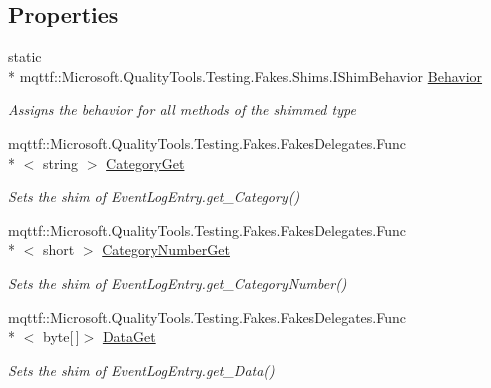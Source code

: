 \subsection*{Properties}
\begin{DoxyCompactItemize}
\item 
static \\*
mqttf\-::\-Microsoft.\-Quality\-Tools.\-Testing.\-Fakes.\-Shims.\-I\-Shim\-Behavior \hyperlink{class_system_1_1_diagnostics_1_1_fakes_1_1_shim_event_log_entry_a1886bfc46491b04a237c2f84fbe996f8}{Behavior}
\begin{DoxyCompactList}\small\item\em Assigns the behavior for all methods of the shimmed type\end{DoxyCompactList}\item 
mqttf\-::\-Microsoft.\-Quality\-Tools.\-Testing.\-Fakes.\-Fakes\-Delegates.\-Func\\*
$<$ string $>$ \hyperlink{class_system_1_1_diagnostics_1_1_fakes_1_1_shim_event_log_entry_ac059a13509fceb3655e0731e4b492466}{Category\-Get}
\begin{DoxyCompactList}\small\item\em Sets the shim of Event\-Log\-Entry.\-get\-\_\-\-Category()\end{DoxyCompactList}\item 
mqttf\-::\-Microsoft.\-Quality\-Tools.\-Testing.\-Fakes.\-Fakes\-Delegates.\-Func\\*
$<$ short $>$ \hyperlink{class_system_1_1_diagnostics_1_1_fakes_1_1_shim_event_log_entry_acba08b6161dc2e9c6ab43d964c9762d1}{Category\-Number\-Get}
\begin{DoxyCompactList}\small\item\em Sets the shim of Event\-Log\-Entry.\-get\-\_\-\-Category\-Number()\end{DoxyCompactList}\item 
mqttf\-::\-Microsoft.\-Quality\-Tools.\-Testing.\-Fakes.\-Fakes\-Delegates.\-Func\\*
$<$ byte\mbox{[}$\,$\mbox{]}$>$ \hyperlink{class_system_1_1_diagnostics_1_1_fakes_1_1_shim_event_log_entry_a48ea6138e9bb60c65b414efd8f1668c7}{Data\-Get}
\begin{DoxyCompactList}\small\item\em Sets the shim of Event\-Log\-Entry.\-get\-\_\-\-Data()\end{DoxyCompactList}\item 

\end{DoxyCompactItemize}
